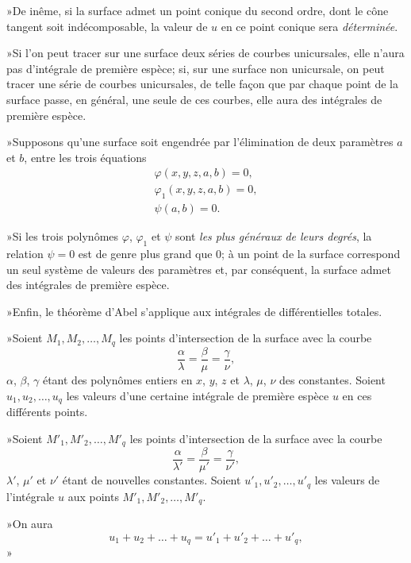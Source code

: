 \documentclass{article}
\begin{document}
»De inême, si la surface admet un point conique du second ordre, dont le cône tangent soit indécomposable, la valeur de $u$ en ce point conique sera \emph{déterminée}.

»Si l'on peut tracer sur une surface deux séries de courbes unicursales, elle n'aura pas d'intégrale de première espèce; si, sur une surface non unicursale, on peut tracer une série de courbes unicursales, de telle façon que par chaque point de la surface passe, en général, une seule de ces courbes, elle aura des intégrales de première espèce.

»Supposons qu'une surface soit engendrée par l'élimination de deux
paramètres $a$ et $b$, entre les trois équations
\[
\begin{gathered}
\varphi(x, y, z, a, b) = 0, \\
\varphi_{1}(x, y, z, a, b) = 0, \\
\psi(a, b) = 0.
\end{gathered}
\]

»Si les trois polynômes $\varphi$, $\varphi_{1}$ et $\psi$ sont \emph{les plus généraux de leurs degrés}, la relation $\psi = 0$ est de genre plus grand que 0; à un point de la surface correspond un seul système de valeurs des paramètres et, par conséquent, la surface admet des intégrales de première espèce.

»Enfin, le théorème d'Abel s'applique aux intégrales de différentielles totales.

»Soient $M_{1}, M_{2}, \ldots, M_{q}$ les points d'intersection de la surface avec la courbe
\[
\frac{\alpha}{\lambda} = \frac{\beta}{\mu} = \frac{\gamma}{\nu},
\]
$\alpha$, $\beta$, $\gamma$ étant des polynômes entiers en $x$, $y$, $z$ et $\lambda$, $\mu$, $\nu$ des constantes. Soient $u_{1}, u_{2}, \ldots, u_{q}$ les valeurs d'une certaine intégrale de première espèce $u$ en ces différents points.

»Soient $M'_{1}, M'_{2}, \ldots, M'_{q}$ les points d'intersection de la surface avec la courbe
\[
\frac{\alpha}{\lambda'} = \frac{\beta}{\mu'} = \frac{\gamma}{\nu'},
\]
$\lambda'$, $\mu'$ et $\nu'$ étant de nouvelles constantes. Soient $u'_{1}, u'_{2}, \ldots, u'_{q}$ les valeurs de l'intégrale $u$ aux points $M'_{1}, M'_{2}, \ldots, M'_{q}$.

»On aura
\[
u_{1} + u_{2} + \ldots + u_{q} = u'_{1} + u'_{2} + \ldots + u'_{q},
\]»
\end{document}
